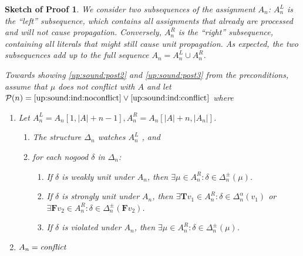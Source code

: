 \documentclass[final]{vutinfth} %
\newtheorem{proof-sketch}{Sketch of Proof}[chapter]
\newcommand{\ass}{A}
\newcommand{\bT}{\mathbf{T}}
\newcommand{\bF}{\mathbf{F}}
\newcommand{\sgl}{\mu}
\begin{document}
\begin{proof-sketch}
We consider two subsequences of the assignment $A_n$: $\ass_n^L$ is the \enquote{left} subsequence, which contains all assignments that already are processed and will not cause propagation. Conversely, $\ass_n^R$ is the \enquote{right} subsequence, containing all literals that might still cause unit propagation. As expected, the two subsequences add up to the full sequence $A_n = A_n^L \cup A_n^R$.

Towards showing \ref{up:sound:post2} and \ref{up:sound:post3} from the preconditions, assume that $\sgl$ does not conflict with $\ass$ and let $\mathcal{P}(n) = \textrm{\ref{up:sound:ind:noconflict}} \vee \textrm{\ref{up:sound:ind:conflict}}$ where

\begin{enumerate}[label=(\Roman*)]
	\item Let $\ass_n^L = \ass_n[1, |A| + n - 1], \ass_n^R = \ass_n[|A| + n, |\ass_n|]$. \label{up:sound:ind:noconflict}
	    \begin{enumerate}[label=(\alph*),ref=\theenumi(\alph*)]
	     \item The structure $\Delta_n$ watches $\ass^L_n$ \label{up:sound:ind:watches}, and
	     \item for each nogood $\delta$ in $\Delta_n$:\label{up:sound:ind:lr}
		\begin{enumerate}[label=(\roman*),ref=\theenumii(\roman*)]
			\item If $\delta$ is weakly unit under $\ass_n$, then $\exists \sgl \in A_n^R : \delta \in \Delta_n^\pm(\sgl)$. \label{up:sound:ind:wu}
			\item If $\delta$ is strongly unit under $\ass_n$, then $\exists {\bT v_1} \in A_n^R : \delta \in \Delta_n^\alpha(v_1)$ or $\exists {\bF v_2} \in A_n^R : \delta \in \Delta_n^\pm({\bF v_2})$. \label{up:sound:ind:su}
			\item If $\delta$ is violated under $\ass_n$, then $\exists \sgl \in A_n^R : \delta \in \Delta_n^\pm(\sgl)$. \label{up:sound:ind:vio}
		\end{enumerate}
	\end{enumerate}
	\item $\ass_n = \emph{conflict}$ \label{up:sound:ind:conflict}
\end{enumerate}


\end{proof-sketch}
\end{document}
